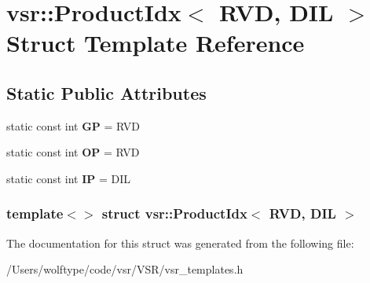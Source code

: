 \hypertarget{structvsr_1_1_product_idx_3_01_r_v_d_00_01_d_i_l_01_4}{\section{vsr\-:\-:Product\-Idx$<$ R\-V\-D, D\-I\-L $>$ Struct Template Reference}
\label{structvsr_1_1_product_idx_3_01_r_v_d_00_01_d_i_l_01_4}
}
\subsection*{Static Public Attributes}
\begin{DoxyCompactItemize}
\item 
\hypertarget{structvsr_1_1_product_idx_3_01_r_v_d_00_01_d_i_l_01_4_a2356cf9e61343b49e97efd04f4b3a3a8}{static const int {\bfseries G\-P} = R\-V\-D}\label{structvsr_1_1_product_idx_3_01_r_v_d_00_01_d_i_l_01_4_a2356cf9e61343b49e97efd04f4b3a3a8}

\item 
\hypertarget{structvsr_1_1_product_idx_3_01_r_v_d_00_01_d_i_l_01_4_a20b9d7c3c6b288946dc31a6a92273a13}{static const int {\bfseries O\-P} = R\-V\-D}\label{structvsr_1_1_product_idx_3_01_r_v_d_00_01_d_i_l_01_4_a20b9d7c3c6b288946dc31a6a92273a13}

\item 
\hypertarget{structvsr_1_1_product_idx_3_01_r_v_d_00_01_d_i_l_01_4_abaabe43d98b8fa478765004bb84191b8}{static const int {\bfseries I\-P} = D\-I\-L}\label{structvsr_1_1_product_idx_3_01_r_v_d_00_01_d_i_l_01_4_abaabe43d98b8fa478765004bb84191b8}

\end{DoxyCompactItemize}
\subsubsection*{template$<$$>$ struct vsr\-::\-Product\-Idx$<$ R\-V\-D, D\-I\-L $>$}



The documentation for this struct was generated from the following file\-:\begin{DoxyCompactItemize}
\item 
/\-Users/wolftype/code/vsr/\-V\-S\-R/vsr\-\_\-templates.\-h\end{DoxyCompactItemize}

